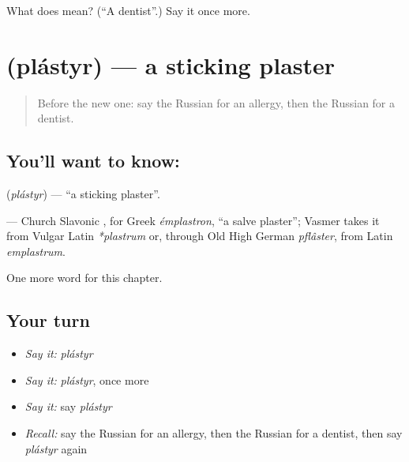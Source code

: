 \begin{tcolorbox}[breakable,colback=teal!4,colframe=teal!35!black,title={Before you move on}]
What does  mean? (\textquotedblleft{}A dentist\textquotedblright{}.) Say it once more.
\end{tcolorbox}
\section[\texorpdfstring{\ru{пластырь} (plástyr)}{пластырь (plástyr)}]{ (plástyr) — a sticking plaster}

\label{lesson:RU-C210-plastyr}



\begin{quote}
Before the new one: say the Russian for an allergy, then the Russian for a dentist.
\end{quote}

\subsection*{You'll want to know: }
\textbf{} (\emph{plástyr}) — \textquotedblleft{}a sticking plaster\textquotedblright{}.

\begin{cousinweb}
\textbf{} — Church Slavonic \emph{}, for Greek \emph{émplastron}, \textquotedblleft{}a salve plaster\textquotedblright{}; Vasmer takes it from Vulgar Latin \emph{*plastrum} or, through Old High German \emph{pflâster}, from Latin \emph{emplastrum}.
\end{cousinweb}

\begin{grammarlens}[title={What you've built}]
One more word for this chapter.
\end{grammarlens}

\subsection*{Your turn}
\begin{itemize}
\raggedright
  \item \emph{Say it:} \emph{plástyr}
  \item \emph{Say it:} \emph{plástyr}, once more
  \item \emph{Say it:} say \emph{plástyr}
  \item \emph{Recall:} say the Russian for an allergy, then the Russian for a dentist, then say \emph{plástyr} again
\end{itemize}


